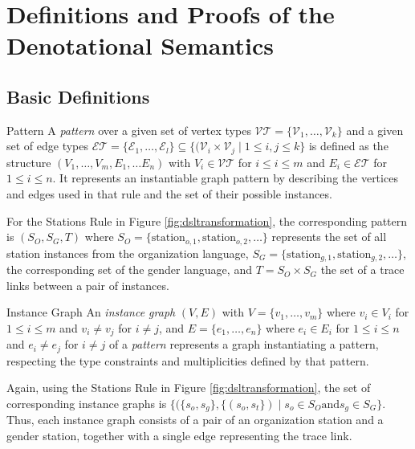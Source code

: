 
\section{Definitions and Proofs of the Denotational Semantics}
\label{sec:proofs_denotation}

\subsection{Basic Definitions}

\begin{definition}{Pattern}
\label{def:rule_pattern}
A \emph{pattern} over a given set of vertex types $\mathcal{VT} = \{ \mathcal{V}_1,\dots,\mathcal{V}_k\}$ and a given set of edge types $\mathcal{ET} = \{ \mathcal{E}_1, \dots,\mathcal{E}_l \} \subseteq \{ (\mathcal{V}_i \times \mathcal{V}_j \mid 1 \leq i,j \leq k \}$ is defined as the structure $(V_1,\dots,V_m,E_1,\dots E_n)$ with $V_i \in \mathcal{VT}$ for $i \leq i \leq m$ and $E_i \in \mathcal{ET}$ for $1 \leq i \leq n$. It represents an instantiable graph pattern by describing the vertices and edges used in that rule and the set of their possible instances.
\end{definition}

\begin{example}
For the Stations Rule in Figure \ref{fig:dsltransformation}, the corresponding pattern is
$(S_O,S_G,T)$ where $S_O = \{ \mbox{station}_{o,1}, \mbox{station}_{o,2},\dots \}$ represents the set of all station instances from the organization language, $S_G = \{ \mbox{station}_{g,1}, \mbox{station}_{g,2},\dots \}$, the corresponding set of the gender language, and $T = S_O \times S_G$ the set of a trace links between a pair of instances.
\end{example}

\begin{definition}{Instance Graph}
\label{def:instance_graph}
An \emph{instance graph} $(V,E)$ with $V = \{ v_1,\dots,v_m \}$ where $v_i \in V_i$ for $1 \leq i \leq m$ and $v_i \neq v_j$ for $i \neq j$, and $E = \{ e_1,\dots, e_n \}$ where $e_i \in E_i$ for $1 \leq i \leq n$ and $e_i \neq e_j$ for $i \neq j$ of a \emph{pattern} represents a graph instantiating a pattern, respecting the type constraints and multiplicities defined by that pattern.
\end{definition}

\begin{example}
Again, using the Stations Rule in Figure \ref{fig:dsltransformation}, the set of corresponding instance graphs is $\{ ( \{ s_o, s_g \} , \{ (s_o, s_t \} ) \mid s_o \in S_O \mbox{and} s_g \in S_G \}$. Thus, each instance graph consists of a pair of an organization station and a gender station, together with a single edge representing the trace link.
\end{example}

